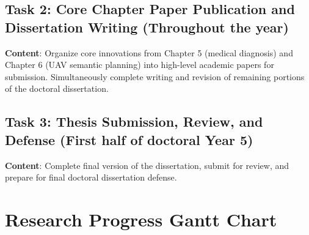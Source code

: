 \subsection{Task 2: Core Chapter Paper Publication and Dissertation Writing (Throughout the year)}

\textbf{Content}: Organize core innovations from Chapter 5 (medical diagnosis) and Chapter 6 (UAV semantic planning) into high-level academic papers for submission. Simultaneously complete writing and revision of remaining portions of the doctoral dissertation.

\subsection{Task 3: Thesis Submission, Review, and Defense (First half of doctoral Year 5)}

\textbf{Content}: Complete final version of the dissertation, submit for review, and prepare for final doctoral dissertation defense.

\section{Research Progress Gantt Chart}

